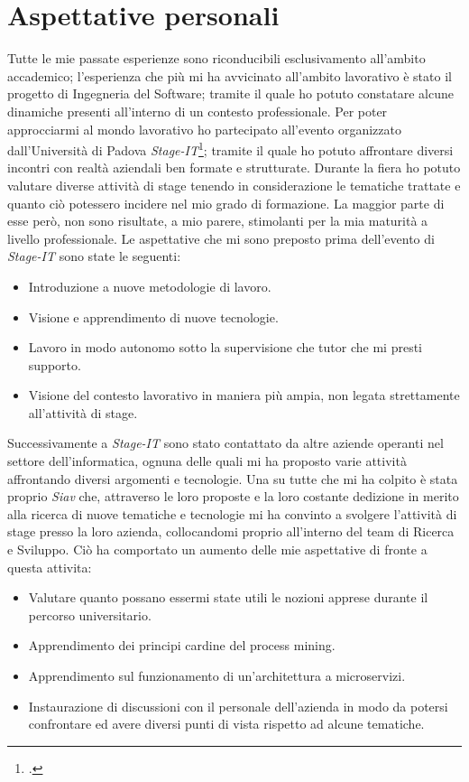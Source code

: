 \section{Aspettative personali}
Tutte le mie passate esperienze sono riconducibili esclusivamento all'ambito accademico; l'esperienza che più mi ha avvicinato all'ambito lavorativo è stato il progetto di Ingegneria del Software; tramite il quale ho potuto constatare alcune dinamiche presenti all'interno di un contesto professionale. Per poter approcciarmi al mondo lavorativo ho partecipato all'evento organizzato dall'Università di Padova \textit{\gls{Stage-IT}}\footcite{Stage-IT: http://informatica.math.unipd.it/laurea/stageit.html}; tramite il quale ho potuto affrontare diversi incontri con realtà aziendali ben formate e strutturate. Durante la fiera ho potuto valutare diverse attività di stage tenendo in considerazione le tematiche trattate e quanto ciò potessero incidere nel mio grado di formazione. La maggior parte di esse però, non sono risultate, a mio parere, stimolanti per la mia maturità a livello professionale. 
Le aspettative che mi sono preposto prima dell'evento di \textit{Stage-IT} sono state le seguenti:
\begin{itemize}
	\item Introduzione a nuove metodologie di lavoro.
	\item Visione e apprendimento di nuove tecnologie.
	\item Lavoro in modo autonomo sotto la supervisione che tutor che mi presti supporto.
	\item Visione del contesto lavorativo in maniera più ampia, non legata strettamente all'attività di stage.
\end{itemize}
Successivamente a \textit{Stage-IT} sono stato contattato da altre aziende operanti nel settore dell'informatica, ognuna delle quali mi ha proposto varie attività affrontando diversi argomenti e tecnologie.
Una su tutte che mi ha colpito è stata proprio \textit{Siav} che, attraverso le loro proposte e la loro costante dedizione in merito alla ricerca di nuove tematiche e tecnologie mi ha convinto a svolgere l'attività di stage presso la loro azienda, collocandomi proprio all'interno del team di Ricerca e Sviluppo. Ciò ha comportato un aumento delle mie aspettative di fronte a questa attivita:
\begin{itemize}
	\item Valutare quanto possano essermi state utili le nozioni apprese durante il percorso universitario.
	\item Apprendimento dei principi cardine del process mining.
	\item Apprendimento sul funzionamento di un'architettura a microservizi.
	\item Instaurazione di discussioni con il personale dell'azienda in modo da potersi confrontare ed avere diversi punti di vista rispetto ad alcune tematiche.
	
\end{itemize}
